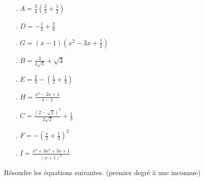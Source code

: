 \documentclass[a4paper, 11pt]{article}
\newif\ifcorrection
\begin{document}
\begin{minipage}{0.33\textwidth}
 \begin{itemize}
  \item[.] $A =\frac{3}{4} (\frac{2}{3} + \frac{1}{2})$ \ifcorrection \textcolor{red}{$=\frac{7}{8}$}\fi \\   
  \item[.] $D=-\frac{1}{3} + \frac{2}{8}$ \ifcorrection \textcolor{red}{$=-\frac{1}{12}$}\fi \\
  \item[.] $G=(x-1)(x^2-3x+\frac{1}{2})$ \ifcorrection \textcolor{red}{$=x^3-4x^2+ \frac{7x}{2} -\frac{1}{2}$}\fi \\ 
 \end{itemize}
\end{minipage}
%
\begin{minipage}{0.3\textwidth}
  \begin{itemize}
  \item[.] $B=\frac{3}{2\sqrt{3}} + \sqrt{3}$ \ifcorrection \textcolor{red}{$=\frac{3\sqrt{3}}{2}$}\fi \\
  \item[.] $E=\frac{2}{3} - (\frac{1}{2} + \frac{1}{3})$ \ifcorrection \textcolor{red}{$=-\frac{1}{6}$}\fi \\
  \item[.] $H=\frac{x^2-2x+1}{x-1}$\ifcorrection \textcolor{red}{$=\frac{(x-1)^2}{x-1}=x-1$}\fi \\
 \end{itemize}
\end{minipage}
%
\begin{minipage}{0.3\textwidth}
  \begin{itemize}
  \item[.] $C=\frac{(2-\sqrt{2})^2}{2\sqrt{2}} + \frac{1}{3}$\ifcorrection\textcolor{red}{$=\frac{9\sqrt{2}-10}{6}$}\fi \\
  \item[.] $F=-(\frac{x}{2} + \frac{1}{3})^2$ \ifcorrection\textcolor{red}{$=-(\frac{x^2}{4}+\frac{x}{3}+\frac{1}{9})$}\fi \\
  \item[.] $I=\frac{x^3+3x^2+3x+1}{(x+1)^2}$ \ifcorrection\textcolor{red}{$=\frac{(x+1)^3}{(x+1)^2}=x+1$}\fi \\
 \end{itemize}
\end{minipage}



\exost R\'esoudre les \'equations suivantes. (premier degr\'e \`a une inconnue)
\end{document}
